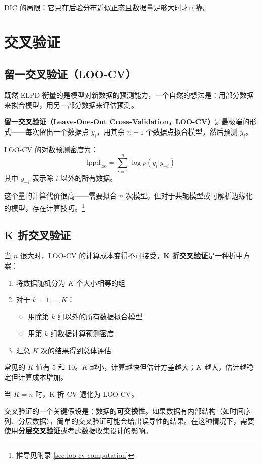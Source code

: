 DIC 的局限：它只在后验分布近似正态且数据量足够大时才可靠。

\section{交叉验证}

\subsection{留一交叉验证（LOO-CV）}

既然 ELPD 衡量的是模型对新数据的预测能力，一个自然的想法是：用部分数据来拟合模型，用另一部分数据来评估预测。

\textbf{留一交叉验证（Leave-One-Out Cross-Validation，LOO-CV）}是最极端的形式——每次留出一个数据点 $y_i$，用其余 $n-1$ 个数据点拟合模型，然后预测 $y_i$。

LOO-CV 的对数预测密度为：
\[
\text{lppd}_{\text{loo}} = \sum_{i=1}^n \log p(y_i | y_{-i})
\]
其中 $y_{-i}$ 表示除 $i$ 以外的所有数据。

这个量的计算代价很高——需要拟合 $n$ 次模型。但对于共轭模型或可解析边缘化的模型，存在计算技巧。\footnote{推导见附录 \cref{sec:loo-cv-computation}}

\subsection{K 折交叉验证}

当 $n$ 很大时，LOO-CV 的计算成本变得不可接受。\textbf{K 折交叉验证}是一种折中方案：

\begin{enumerate}
  \item 将数据随机分为 $K$ 个大小相等的组
  \item 对于 $k = 1, \ldots, K$：
    \begin{itemize}
      \item 用除第 $k$ 组以外的所有数据拟合模型
      \item 用第 $k$ 组数据计算预测密度
    \end{itemize}
  \item 汇总 $K$ 次的结果得到总体评估
\end{enumerate}

常见的 $K$ 值有 5 和 10。$K$ 越小，计算越快但估计方差越大；$K$ 越大，估计越稳定但计算成本增加。

当 $K = n$ 时，K 折 CV 退化为 LOO-CV。

\begin{Remark}
  交叉验证的一个关键假设是：数据的\textbf{可交换性}。如果数据有内部结构（如时间序列、分层数据），简单的交叉验证可能会给出误导性的结果。在这种情况下，需要使用\textbf{分层交叉验证}或考虑数据收集设计的影响。
\end{Remark}

